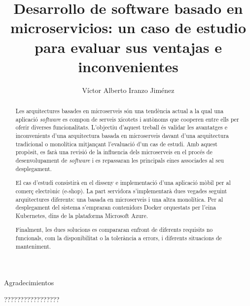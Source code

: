 \documentclass[11pt,spanish,listoffigures]{tfgetsinf}
\title{ Desarrollo de software basado en microservicios: un caso de estudio para evaluar sus ventajas e inconvenientes }
\author{Víctor Alberto Iranzo Jiménez}
\begin{document}
{\Huge Agradecimientos}

?????????????????

\newpage


\begin{abstract}

Les arquitectures basades en microserveis són una tendència actual a la qual una aplicació \textit{software} es compon de serveis xicotets i autònoms que cooperen entre ells per oferir diverses funcionalitats. L’objectiu d’aquest treball és validar les avantatges e inconvenients d’una arquitectura basada en microserveis davant d’una arquitectura tradicional o monolítica mitjançant l’evaluació d’un cas de estudi. Amb aquest propòsit, es farà una revisió de la influencia dels microserveis en el procés de desenvolupament de \textit{software} i es repassaran les principals eines associades al seu desplegament.

El cas d’estudi consistirà en el disseny e implementació d’una aplicació  mòbil per al comerç electrònic (e-shop). La part servidora s’implementarà dues vegades seguint arquitectures diferents: una basada en microserveis i una altra monolítica. Per al desplegament del sistema s’empraran contenidors Docker orquestats per l’eina Kubernetes, dins de la plataforma Microsoft Azure.

Finalment, les dues solucions es compararan enfront de diferents requisits no funcionals, com la disponibilitat o la tolerància a errors, i diferents situacions de manteniment.

\end{abstract}
\end{document}
